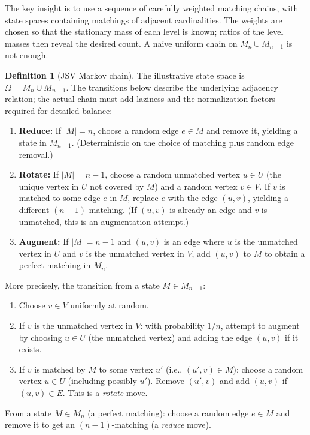 \documentclass[twoside,12pt]{book}
\theoremstyle{plain}
\theoremstyle{definition}
\newtheorem{definition}[theorem]{Definition}
\theoremstyle{remark}
\begin{document}
The key insight is to use a sequence of carefully weighted matching chains,
with state spaces containing matchings of adjacent cardinalities. The weights
are chosen so that the stationary mass of each level is known; ratios of the
level masses then reveal the desired count. A naive uniform chain on
$M_n\cup M_{n-1}$ is not enough.

\begin{definition}[JSV Markov chain]
\label{def:jsv-chain}
The illustrative state space is $\Omega = M_n \cup M_{n-1}$. The transitions
below describe the underlying adjacency relation; the actual chain must add
laziness and the normalization factors required for detailed balance:
\begin{enumerate}[nosep]
    \item \textbf{Reduce:} If $|M| = n$, choose a random edge $e \in M$ and remove it, yielding a state in $M_{n-1}$. (Deterministic on the choice of matching plus random edge removal.)
    \item \textbf{Rotate:} If $|M| = n-1$, choose a random unmatched vertex $u \in U$ (the unique vertex in $U$ not covered by $M$) and a random vertex $v \in V$. If $v$ is matched to some edge $e$ in $M$, replace $e$ with the edge $(u, v)$, yielding a different $(n-1)$-matching. (If $(u, v)$ is already an edge and $v$ is unmatched, this is an augmentation attempt.)
    \item \textbf{Augment:} If $|M| = n-1$ and $(u, v)$ is an edge where $u$ is the unmatched vertex in $U$ and $v$ is the unmatched vertex in $V$, add $(u, v)$ to $M$ to obtain a perfect matching in $M_n$.
\end{enumerate}
\end{definition}

More precisely, the transition from a state $M \in M_{n-1}$:
\begin{enumerate}[nosep]
    \item Choose $v \in V$ uniformly at random.
    \item If $v$ is the unmatched vertex in $V$: with probability $1/n$, attempt to augment by choosing $u \in U$ (the unmatched vertex) and adding the edge $(u, v)$ if it exists.
    \item If $v$ is matched by $M$ to some vertex $u'$ (i.e., $(u', v) \in M$): choose a random vertex $u \in U$ (including possibly $u'$). Remove $(u', v)$ and add $(u, v)$ if $(u, v) \in E$. This is a \emph{rotate} move.
\end{enumerate}

From a state $M \in M_n$ (a perfect matching): choose a random edge $e \in M$ and remove it to get an $(n-1)$-matching (a \emph{reduce} move).
\end{document}
